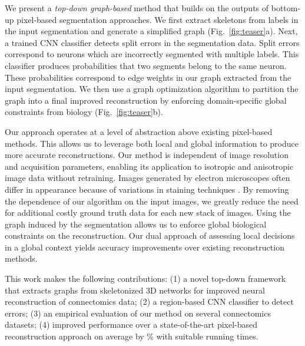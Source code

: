 We present a \textit{top-down graph-based} method that builds on the outputs of bottom-up pixel-based segmentation approaches. 
We first extract skeletons from labels in the input segmentation and generate a simplified graph (Fig.~\ref{fig:teaser}a). 
Next, a trained CNN classifier detects split errors in the segmentation data. 
Split errors correspond to neurons which are incorrectly segmented with multiple labels. 
This classifier produces probabilities that two segments belong to the same neuron.
These probabilities correspond to edge weights in our graph extracted from the input segmentation.
We then use a graph optimization algorithm to partition the graph into a final improved reconstruction by enforcing domain-specific global constraints from biology (Fig.~\ref{fig:teaser}b).

Our approach operates at a level of abstraction above existing pixel-based methods. 
This allows us to leverage both local and global information to produce more accurate reconstructions. 
Our method is independent of image resolution and acquisition parameters, enabling its application to isotropic and anisotropic image data without retraining.
Images generated by electron microscopes often differ in appearance because of variations in staining techniques \cite{briggman2012volume}.
By removing the dependence of our algorithm on the input images, we greatly reduce the need for additional costly ground truth data for each new stack of images.
Using the graph induced by the segmentation allows us to enforce global biological constraints on the reconstruction. 
Our dual approach of assessing local decisions in a global context yields accuracy improvements over existing reconstruction methods.

This work makes the following contributions: (1) a novel top-down framework that extracts graphs from skeletonized 3D networks for improved neural reconstruction of connectomics data; (2) a region-based CNN classifier to detect errors; (3) an empirical evaluation of our method on several connectomics datasets; (4) improved performance over a state-of-the-art pixel-based reconstruction approach on average by \% with suitable running times.
